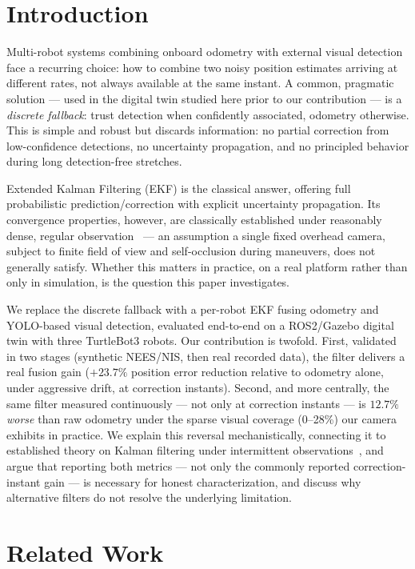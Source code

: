 \documentclass[runningheads]{llncs}
\begin{document}
\section{Introduction}

Multi-robot systems combining onboard odometry with external visual
detection face a recurring choice: how to combine two noisy position
estimates arriving at different rates, not always available at the same
instant. A common, pragmatic solution — used in the digital twin studied
here prior to our contribution — is a \emph{discrete fallback}: trust
detection when confidently associated, odometry otherwise. This is
simple and robust but discards information: no partial correction from
low-confidence detections, no uncertainty propagation, and no principled
behavior during long detection-free stretches.

Extended Kalman Filtering (EKF) is the classical answer, offering full
probabilistic prediction/correction with explicit uncertainty
propagation. Its convergence properties, however, are classically
established under reasonably dense, regular
observation~\cite{dissanayake2001slam} — an assumption a single fixed
overhead camera, subject to finite field of view and self-occlusion
during maneuvers, does not generally satisfy. Whether this matters in
practice, on a real platform rather than only in simulation, is the
question this paper investigates.

We replace the discrete fallback with a per-robot EKF fusing odometry
and YOLO-based visual detection, evaluated end-to-end on a ROS2/Gazebo
digital twin with three TurtleBot3 robots. Our contribution is
twofold. First, validated in two stages (synthetic NEES/NIS, then real
recorded data), the filter delivers a real fusion gain ($+23.7\%$
position error reduction relative to odometry alone, under aggressive
drift, at correction instants). Second, and more centrally, the same
filter measured continuously — not only at correction
instants — is $12.7\%$ \emph{worse} than raw odometry under the sparse
visual coverage (0--28\%) our camera exhibits in practice. We explain
this reversal mechanistically, connecting it to established theory on
Kalman filtering under intermittent
observations~\cite{sinopoli2004intermittent,censi2009geometric}, and
argue that reporting both metrics — not only the commonly reported
correction-instant gain — is necessary for honest characterization, and
discuss why alternative filters do not resolve the underlying
limitation.

\section{Related Work}
\label{sec:related-work}
\end{document}
